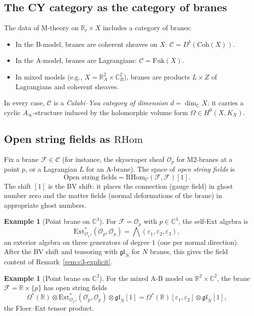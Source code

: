 \documentclass[11pt]{article}
\theoremstyle{definition}
\newtheorem{example}[theorem]{Example}
\theoremstyle{remark}
\newcommand{\RHom}{\mathrm{RHom}}
\newcommand{\Ext}{\mathrm{Ext}}
\newcommand{\Ainf}{A_\infty}
\newcommand{\Coh}{\mathrm{Coh}}
\newcommand{\Fuk}{\mathrm{Fuk}}
\newcommand{\cC}{\mathcal{C}}
\newcommand{\cF}{\mathcal{F}}
\newcommand{\cO}{\mathcal{O}}
\newcommand{\frakgl}{\mathfrak{gl}}
\begin{document}
\subsection{The CY category as the category of branes}

The data of M-theory on $\mathbb{R}_t \times X$ includes a category of branes:
\begin{itemize}
 \item In the B-model, branes are coherent sheaves on $X$:
 $\cC = D^b(\Coh(X))$.
 \item In the A-model, branes are Lagrangians:
 $\cC = \Fuk(X)$.
 \item In mixed models (e.g., $X = \mathbb{R}^2_A \times \mathbb{C}^2_B$),
 branes are products $L \times Z$ of Lagrangians and coherent sheaves.
\end{itemize}
In every case, $\cC$ is a \emph{Calabi--Yau category of dimension $d = \dim_\mathbb{C} X$}: it carries a cyclic $\Ainf$-structure induced by the holomorphic volume form $\Omega \in H^0(X, K_X)$.

\subsection{Open string fields as $\RHom$}

Fix a brane $\cF \in \cC$ (for instance, the skyscraper sheaf $\cO_p$ for M2-branes at a point $p$, or a Lagrangian $L$ for an A-brane). The space of \emph{open string fields} is
\[
 \boxed{\;
 \text{Open string fields} = \RHom_\cC(\cF, \cF)[1].
 \;}
\]
The shift $[1]$ is the BV shift: it places the connection (gauge field) in
ghost number zero and the matter fields (normal deformations of the brane) in
appropriate ghost numbers.

\begin{example}[Point brane on $\mathbb{C}^3$]
For $\cF = \cO_p$ with $p \in \mathbb{C}^3$, the self-Ext algebra is
\[
 \Ext^*_{\cO_{\mathbb{C}^3}}(\cO_p, \cO_p)
 = \bigwedge(\varepsilon_1, \varepsilon_2, \varepsilon_3),
\]
an exterior algebra on three generators of degree $1$ (one per normal
direction). After the BV shift and tensoring with $\frakgl_N$ for $N$ branes,
this gives the field content of Remark~\ref{rem:c3-explicit}.
\end{example}

\begin{example}[Point brane on $\mathbb{C}^2$]
For the mixed A-B model on $\mathbb{R}^2 \times \mathbb{C}^2$, the brane
$\cF = \mathbb{R} \times \{p\}$ has open string fields
\[
 \Omega^*(\mathbb{R})
 \otimes \Ext^*_{\cO_{\mathbb{C}^2}}(\cO_p, \cO_p)
 \otimes \frakgl_N[1]
 = \Omega^*(\mathbb{R})[\varepsilon_1, \varepsilon_2]
 \otimes \frakgl_N[1],
\]
the Floer--Ext tensor product.
\end{example}
\end{document}
